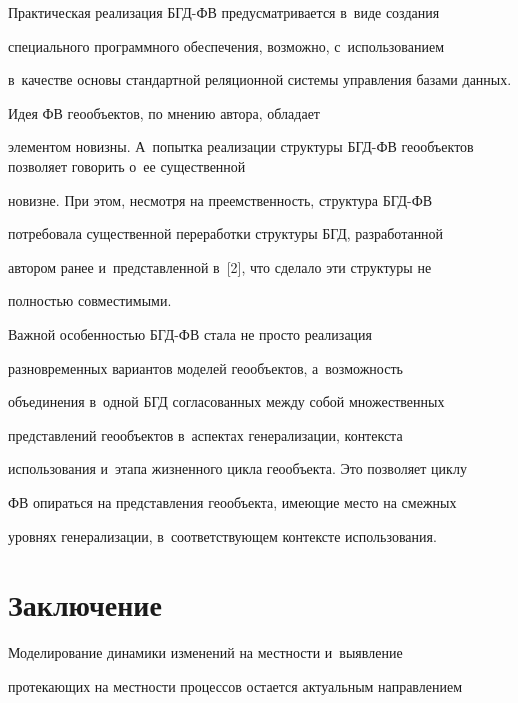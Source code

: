   


  Практическая реализация БГД-ФВ предусмат\-ри\-ва\-ет\-ся в~виде создания 


специального программного обеспечения, возможно, с~использованием 


в~качестве основы стандартной реляционной системы управления базами данных.


  


  Идея ФВ геообъектов, по мнению автора, обладает 


элементом новизны. А~попытка реализации структуры \mbox{БГД-ФВ} геообъектов поз\-во\-ля\-ет говорить о~ее существенной 


новизне. При этом, несмотря на преемственность, структура \mbox{БГД-ФВ} 


потребовала существенной переработки структуры БГД, разработанной 


автором ранее и~пред\-став\-лен\-ной в~[2], что сделало эти структуры не 


пол\-ностью совместимыми.


  


  Важной особенностью БГД-ФВ стала не просто реализация 


разновременных вариантов моделей геообъектов, а~воз\-мож\-ность 


объединения в~одной БГД согласованных между собой множественных 


представлений геообъектов в~аспектах генерализации, контекста 


использования и~этапа жизненного цикла геообъекта. Это поз\-во\-ля\-ет цик\-лу 


ФВ опираться на пред\-став\-ле\-ния геообъекта, име\-ющие место на смежных 


уровнях генерализации, в~со\-от\-вет\-ст\-ву\-ющем контексте использования.


     


     \section{Заключение}


     


  Моделирование динамики изменений на мест\-ности и~выявление 


про\-те\-ка\-ющих на мест\-ности процессов остается актуальным на\-прав\-ле\-ни\-ем 


